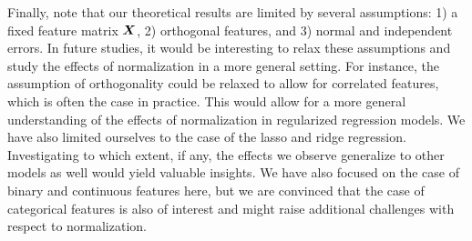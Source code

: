 Finally, note that our theoretical results are limited by several assumptions: 1) a fixed
feature matrix \(\boldsymbol{X}\), 2) orthogonal features, and 3) normal and independent errors.
In future studies, it would be interesting to relax these assumptions and study the effects
of normalization in a more general setting. For instance, the assumption of orthogonality
could be relaxed to allow for correlated features, which is often the case in practice.
This would allow for a more general understanding of the effects of normalization in
regularized regression models. We have also limited ourselves to the case of the lasso and
ridge regression. Investigating to which extent, if any, the effects we observe generalize
to other models as well would yield valuable insights. We have also focused on the case of
binary and continuous features here, but we are convinced that the case of categorical
features is also of interest and might raise additional challenges with respect to
normalization.

